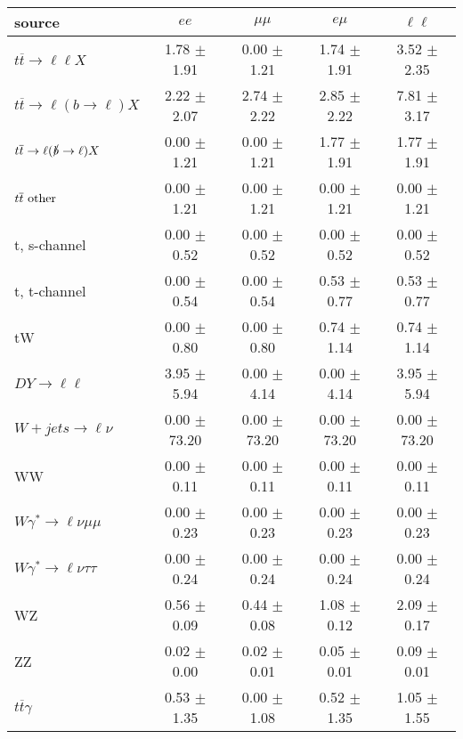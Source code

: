 \begin{tabular}{l|cccc} \hline\hline
source & $ee$ & $\mu\mu$ & $e\mu$ & $\ell\ell $ \\
\hline
$t\overline{t} \rightarrow \ell \ell X$ &  1.78 $\pm$  1.91 &  0.00 $\pm$  1.21 &  1.74 $\pm$  1.91 &  3.52 $\pm$  2.35 \\
$t\overline{t} \rightarrow \ell (b \rightarrow \ell) X$ &  2.22 $\pm$  2.07 &  2.74 $\pm$  2.22 &  2.85 $\pm$  2.22 &  7.81 $\pm$  3.17 \\
$t\overline{t} \rightarrow \ell (\slashed b \rightarrow \ell) X$ &  0.00 $\pm$  1.21 &  0.00 $\pm$  1.21 &  1.77 $\pm$  1.91 &  1.77 $\pm$  1.91 \\
        $t\overline{t}\ \rm{other}$ &  0.00 $\pm$  1.21 &  0.00 $\pm$  1.21 &  0.00 $\pm$  1.21 &  0.00 $\pm$  1.21 \\
\hline
                       t, s-channel &  0.00 $\pm$  0.52 &  0.00 $\pm$  0.52 &  0.00 $\pm$  0.52 &  0.00 $\pm$  0.52 \\
                       t, t-channel &  0.00 $\pm$  0.54 &  0.00 $\pm$  0.54 &  0.53 $\pm$  0.77 &  0.53 $\pm$  0.77 \\
                                 tW &  0.00 $\pm$  0.80 &  0.00 $\pm$  0.80 &  0.74 $\pm$  1.14 &  0.74 $\pm$  1.14 \\
\hline
         $DY \rightarrow \ell \ell$ &  3.95 $\pm$  5.94 &  0.00 $\pm$  4.14 &  0.00 $\pm$  4.14 &  3.95 $\pm$  5.94 \\
      $W+jets \rightarrow \ell \nu$ &  0.00 $\pm$ 73.20 &  0.00 $\pm$ 73.20 &  0.00 $\pm$ 73.20 &  0.00 $\pm$ 73.20 \\
                                 WW &  0.00 $\pm$  0.11 &  0.00 $\pm$  0.11 &  0.00 $\pm$  0.11 &  0.00 $\pm$  0.11 \\
\hline
$W\gamma^{*} \rightarrow \ell \nu \mu\mu$ &  0.00 $\pm$  0.23 &  0.00 $\pm$  0.23 &  0.00 $\pm$  0.23 &  0.00 $\pm$  0.23 \\
$W\gamma^{*} \rightarrow \ell \nu \tau\tau$ &  0.00 $\pm$  0.24 &  0.00 $\pm$  0.24 &  0.00 $\pm$  0.24 &  0.00 $\pm$  0.24 \\
                                 WZ &  0.56 $\pm$  0.09 &  0.44 $\pm$  0.08 &  1.08 $\pm$  0.12 &  2.09 $\pm$  0.17 \\
                                 ZZ &  0.02 $\pm$  0.00 &  0.02 $\pm$  0.01 &  0.05 $\pm$  0.01 &  0.09 $\pm$  0.01 \\
\hline
              $t\overline{t}\gamma$ &  0.53 $\pm$  1.35 &  0.00 $\pm$  1.08 &  0.52 $\pm$  1.35 &  1.05 $\pm$  1.55 \\

\end{tabular}
